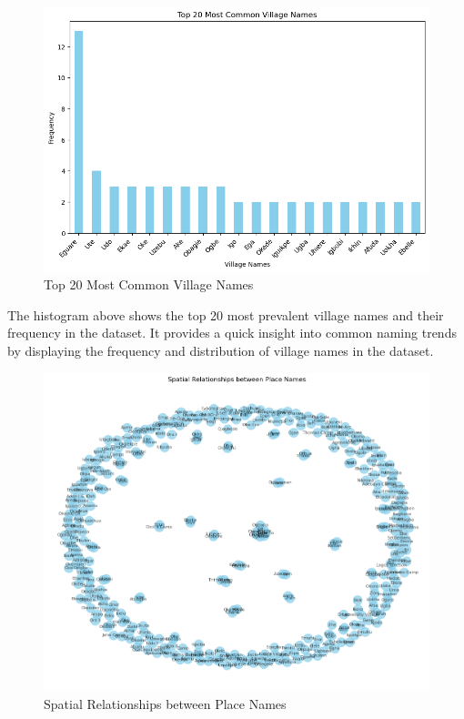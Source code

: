 \begin{figure}[htb]
    \centering
    \includegraphics[width=.8\linewidth]{histogram2.png}
    \caption{Top 20 Most Common Village Names}
    \label{fig:histogram2}
\end{figure}

The histogram above shows the top 20 most prevalent village names and their frequency in the dataset. It provides a quick insight into common naming trends by displaying the frequency and distribution of village names in the dataset.

\begin{figure}[htb]
    \centering
    \includegraphics[width=1\linewidth]{networkanalysis.png}
    \caption{Spatial Relationships between Place Names}
    \label{fig:network}
\end{figure}

